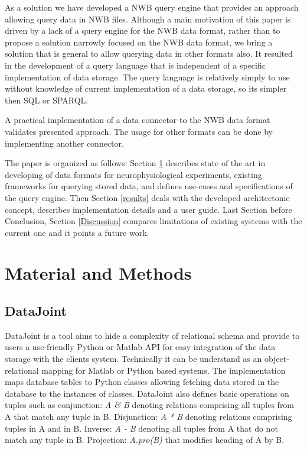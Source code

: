 \documentclass[utf8]{frontiersSCNS} %
\begin{document}
As a solution we have developed a NWB query engine that provides an approach allowing query data in NWB files. Although a main motivation of this paper is driven by a lack of a query engine for the NWB data format, rather than to propose a solution narrowly focused on the NWB data format, we bring a solution that is general to allow querying data in other formats also. It resulted in the development of a query language that is independent of a specific implementation of data storage. The query language is relatively simply to use without knowledge of current implementation of a data storage, so its simpler then SQL or SPARQL.

A practical implementation of a data connector to the NWB data format validates presented approach. The usage for other formats can be done by implementing another connector.

The paper is organized as follows: Section \ref{materials_and_methods} describes state of the art in developing of data formats for neurophysiological experiments, existing frameworks for querying stored data, and defines use-cases and specifications of the query engine. Then Section  \ref{results}  deals with the developed architectonic concept, describes implementation details and a user guide. Last Section before Conclusion, Section  \ref{Discussion} compares limitations of existing systems with the current one and it points a future work. 

\section{Material and Methods}
\label{materials_and_methods}


\subsection{DataJoint}
\label{DataJoint}

DataJoint \citep{Yatsenko031658} is a tool aims to hide a complexity of relational schema and provide to users a use-friendly Python or Matlab API for easy integration of the data storage with the clients system. Technically it can be understand as an object-relational mapping \citep{Keith2010} for Matlab or Python based systems. The implementation maps database tables to Python classes allowing fetching data stored in the database to the instances of classes. DataJoint also defines basic operations on tuples such as conjunction: \emph{A \& B} denoting relations comprising all tuples from A that match any tuple in B. Disjunction: \emph{A * B} denoting relations comprising tuples in A and in B. Inverse: \emph{A - B} denoting all tuples from A that do not match any tuple in B. Projection: \emph{A.pro(B)} that modifies heading of A by B.
\end{document}

